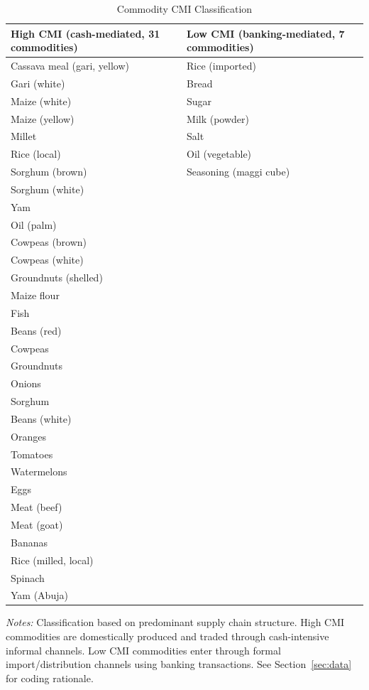 \documentclass[12pt]{article}
\begin{document}
\begin{table}[htbp]
\centering
\caption{Commodity CMI Classification}
\label{tab:cmi_classification}
\footnotesize
\begin{tabular}{ll}
\toprule
\textbf{High CMI (cash-mediated, 31 commodities)} & \textbf{Low CMI (banking-mediated, 7 commodities)} \\
\midrule
Cassava meal (gari, yellow) & Rice (imported) \\
Gari (white) & Bread \\
Maize (white) & Sugar \\
Maize (yellow) & Milk (powder) \\
Millet & Salt \\
Rice (local) & Oil (vegetable) \\
Sorghum (brown) & Seasoning (maggi cube) \\
Sorghum (white) & \\
Yam & \\
Oil (palm) & \\
Cowpeas (brown) & \\
Cowpeas (white) & \\
Groundnuts (shelled) & \\
Maize flour & \\
Fish & \\
Beans (red) & \\
Cowpeas & \\
Groundnuts & \\
Onions & \\
Sorghum & \\
Beans (white) & \\
Oranges & \\
Tomatoes & \\
Watermelons & \\
Eggs & \\
Meat (beef) & \\
Meat (goat) & \\
Bananas & \\
Rice (milled, local) & \\
Spinach & \\
Yam (Abuja) & \\
\bottomrule
\end{tabular}
\par\vspace{0.3em}
{\footnotesize \textit{Notes:} Classification based on predominant supply chain structure. High CMI commodities are domestically produced and traded through cash-intensive informal channels. Low CMI commodities enter through formal import/distribution channels using banking transactions. See Section~\ref{sec:data} for coding rationale.}
\end{table}
\end{document}

